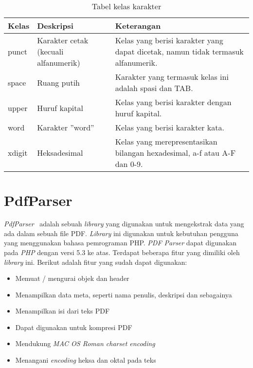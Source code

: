 \begin{table}[H]
	\renewcommand{\arraystretch}{1.5}
	\caption {Tabel kelas karakter} \label{tab:character classes}
	\begin{center}
		\begin{tabular}{|p{2 cm}|>{\raggedright} p{5 cm}| p{7.5 cm}|}
		\hline
		Kelas & Deskripsi & Keterangan \\ 
		\hline   
		punct & Karakter cetak (kecuali alfanumerik) & Kelas yang berisi karakter yang dapat dicetak, namun tidak termasuk alfanumerik. \newline \\ 
		\hline		
		space & Ruang putih & Karakter yang termasuk kelas ini adalah spasi dan TAB. \newline \\ 
		\hline 
		upper & Huruf kapital & Kelas yang berisi karakter dengan huruf kapital. \newline \\ 
		\hline 
		word & Karakter ''word'' & Kelas yang berisi karakter kata. \newline \\ 
		\hline 
		xdigit & Heksadesimal & Kelas yang merepresentasikan bilangan hexadesimal, a-f atau A-F dan 0-9. \newline \\ 
		\hline 
		\end{tabular} 
	\end{center}
\end{table}

\section{PdfParser}
\label{sec:pdfparser}

\textit{PdfParser}~\cite{pdfparser} adalah sebuah \textit{library} yang digunakan untuk mengekstrak data yang ada dalam sebuah file PDF. \textit{Library} ini digunakan untuk kebutuhan pengguna yang menggunakan bahasa pemrograman PHP. \textit{PDF Parser} dapat digunakan pada \textit{PHP} dengan versi 5.3 ke atas. Terdapat beberapa fitur yang dimiliki oleh \textit{library} ini. Berikut adalah fitur yang sudah dapat digunakan:

\begin{itemize}
	\item Memuat / mengurai objek dan header
	\item Menampilkan data meta, seperti nama penulis, deskripsi dan sebagainya
	\item Menampilkan isi dari teks PDF
	\item Dapat digunakan untuk kompresi PDF
	\item Mendukung \textit{MAC OS Roman charset encoding}
	\item Menangani \textit{encoding} heksa dan oktal pada teks
\end{itemize}

